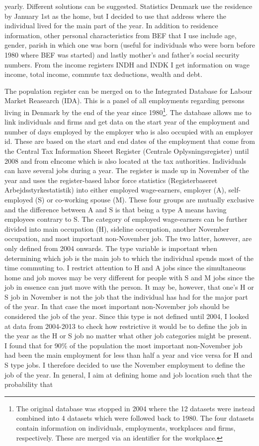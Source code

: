 yearly. Different solutions can be suggested. Statistics Denmark use the residence by January 1st as the home, but I decided to use that address where the individual lived for the main part of the year. In addition to residence information, other personal characteristics from BEF that I use include age, gender, parish in which one was born (useful for individuals who were born before 1980 where BEF was started) and lastly mother's and father's social security numbers. From the income registers INDH and INDK I get information on wage income, total income, commute tax deductions, wealth and debt. 

The population register can be merged on to the Integrated Database for Labour Market Reasearch (IDA). This is a panel of all employments regarding persons living in Denmark by the end of the year since 1980\footnote{The original database was stopped in 2004 where the 12 datasets were instead combined into 4 datasets which were followed back to 1980. The four datasets contain information on individuals, employments, workplaces and firms, respectively. These are merged via an identifier for the workplace.}. The database allows me to link individuals and firms and get data on the start year of the employment and number of days employed by the employer who is also occupied with an employer id. These are based on the start and end dates of the employment that come from the Central Tax Information Sheeet Register (Centrale Oplysningsregister) until 2008 and from eIncome which is also located at the tax authorities. Individuals can have several jobs during a year. The register is made up in November of the year and uses the register-based labor force statistics (Registerbaseret Arbejdsstyrkestatistik) into either employed wage-earners, employer (A), self-employed (S) or co-working spouse (M). These four groups are mutually exclusive and the difference between A and S is that being a type A means having employees contrary to S. The category of employed wage-earners can be further divided into main occupation (H), sideline occupation, another November occupation, and most important non-November job. The two latter, however, are only defined from 2004 onwards. The type variable is important when determining which job is the main job to which the individual spends most of the time commuting to. I restrict attention to H and A jobs since the simultaneous home and job moves may be very different for people with S and M jobs since the job in essence can just move with the person. It may be, however, that one's H or S job in November is not the job that the individual has had for the major part of the year. In that case the most important non-November job should be considered the job of the year. Since this type is not defined until 2004, I looked at data from 2004-2013 to check how restrictive it would be to define the job in the year as the H or S job no matter what other job categories might be present. I found that for 90\% of the population the most important non-November job had been the main employment for less than half a year and vice versa for H and S type jobs. I therefore decided to use the November employment to define the job of the year. In general, I aim at defining home and job location such that the probability that 